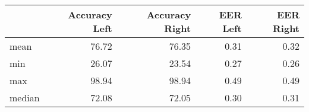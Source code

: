 \begin{tabular}{lrrrr}
\toprule
{} &  Accuracy Left &  Accuracy Right &  EER Left &  EER Right \\
\midrule
mean   &          76.72 &           76.35 &      0.31 &       0.32 \\
min    &          26.07 &           23.54 &      0.27 &       0.26 \\
max    &          98.94 &           98.94 &      0.49 &       0.49 \\
median &          72.08 &           72.05 &      0.30 &       0.31 \\
\bottomrule
\end{tabular}
